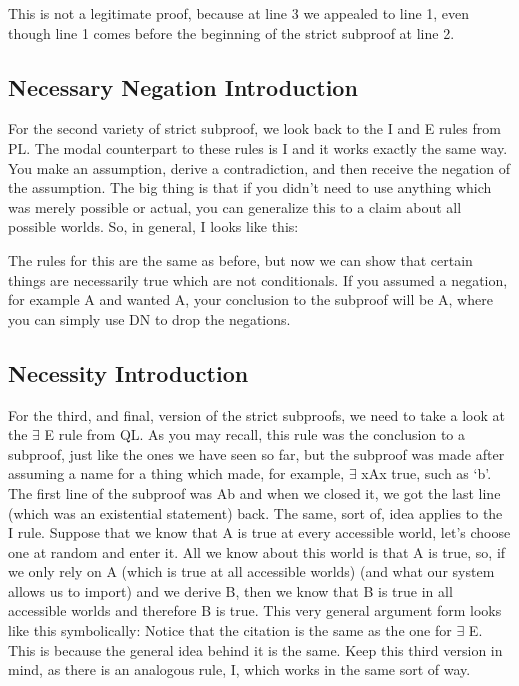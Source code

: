 This is not a legitimate proof, because at line 3 we appealed to line 1, even though line 1 comes before the beginning of the strict subproof at line 2.

\subsection{Necessary Negation Introduction}

For the second variety of strict subproof, we look back to the \enot I and \enot E rules from PL. The modal counterpart to these rules is \ebox \enot I and it works exactly the same way. You make an assumption, derive a contradiction, and then receive the negation of the assumption. The big thing is that if you didn't need to use anything which was merely possible or actual, you can generalize this to a claim about all possible worlds. So, in general, \ebox \enot I looks like this: 

The rules for this are the same as before, but now we can show that certain things are necessarily true which are not conditionals. If you assumed a negation, for example \enot A and wanted \ebox A, your conclusion to the subproof will be \ebox \enot \enot A, where you can simply use DN to drop the negations. 

\subsection{Necessity Introduction}

For the third, and final, version of the strict subproofs, we need to take a look at the $\exists$ E rule from QL. As you may recall, this rule was the conclusion to a subproof, just like the ones we have seen so far, but the subproof was made after assuming a name for a thing which made, for example, $\exists$ xAx true, such as `b'. The first line of the subproof was Ab and when we closed it, we got the last line (which was an existential statement) back. The same, sort of, idea applies to the \ebox I rule. Suppose that we know that A is true at every accessible world, let's choose one at random and enter it. All we know about this world is that A is true, so, if we only rely on A (which is true at all accessible worlds) (and what our system allows us to import) and we derive B, then we know that B is true in all accessible worlds and therefore \ebox B is true. This very general argument form looks like this symbolically:
Notice that the citation is the same as the one for $\exists$ E. This is because the general idea behind it is the same. Keep this third version in mind, as there is an analogous rule, \ediamond I, which works in the same sort of way.
